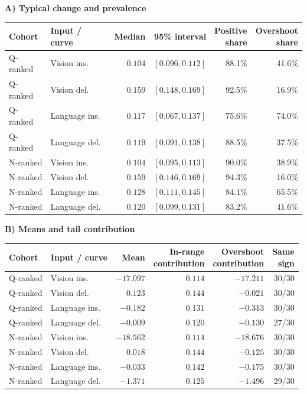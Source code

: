 \begingroup\centering\setlength{\tabcolsep}{3pt}\renewcommand{\arraystretch}{1.12}
\textbf{A) Typical change and prevalence}\par\smallskip
\begin{tabular}{@{}llrrrr@{}}\toprule
Cohort & Input / curve & Median & 95\% interval & \shortstack{Positive\\share} & \shortstack{Overshoot\\share} \\
\midrule
Q-ranked & Vision ins. & $0.104$ & $[0.096, 0.112]$ & 88.1\% & 41.6\% \\
Q-ranked & Vision del. & $0.159$ & $[0.148, 0.169]$ & 92.5\% & 16.9\% \\
Q-ranked & Language ins. & $0.117$ & $[0.067, 0.137]$ & 75.6\% & 74.0\% \\
Q-ranked & Language del. & $0.119$ & $[0.091, 0.138]$ & 88.5\% & 37.5\% \\
\midrule
N-ranked & Vision ins. & $0.104$ & $[0.095, 0.113]$ & 90.0\% & 38.9\% \\
N-ranked & Vision del. & $0.159$ & $[0.146, 0.169]$ & 94.3\% & 16.0\% \\
N-ranked & Language ins. & $0.128$ & $[0.111, 0.145]$ & 84.1\% & 65.5\% \\
N-ranked & Language del. & $0.120$ & $[0.099, 0.131]$ & 83.2\% & 41.6\% \\
\bottomrule\end{tabular}
\par\medskip\textbf{B) Means and tail contribution}\par\smallskip
\begin{tabular}{@{}llrrrr@{}}\toprule
Cohort & Input / curve & Mean & \shortstack{In-range\\contribution} & \shortstack{Overshoot\\contribution} & \shortstack{Same\\sign} \\
\midrule
Q-ranked & Vision ins. & $-17.097$ & $0.114$ & $-17.211$ & 30/30 \\
Q-ranked & Vision del. & $0.123$ & $0.144$ & $-0.021$ & 30/30 \\
Q-ranked & Language ins. & $-0.182$ & $0.131$ & $-0.313$ & 30/30 \\
Q-ranked & Language del. & $-0.009$ & $0.120$ & $-0.130$ & 27/30 \\
\midrule
N-ranked & Vision ins. & $-18.562$ & $0.114$ & $-18.676$ & 30/30 \\
N-ranked & Vision del. & $0.018$ & $0.144$ & $-0.125$ & 30/30 \\
N-ranked & Language ins. & $-0.033$ & $0.142$ & $-0.175$ & 30/30 \\
N-ranked & Language del. & $-1.371$ & $0.125$ & $-1.496$ & 29/30 \\
\bottomrule\end{tabular}
\endgroup
